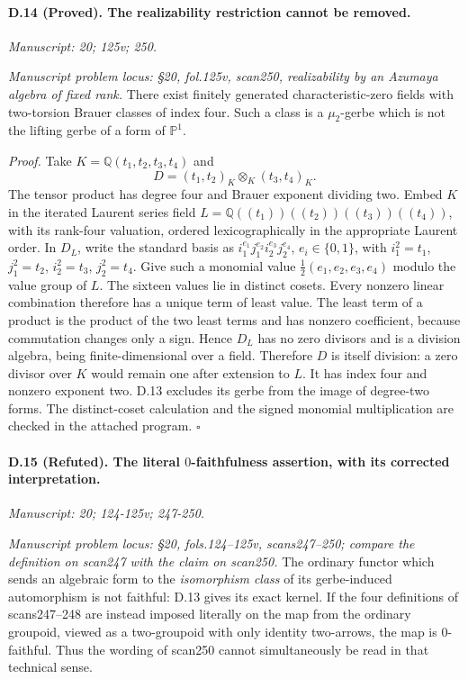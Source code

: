\paragraph{D.14 (Proved). The realizability restriction cannot be removed.}
\textit{Manuscript: 20; 125v; 250.}

\emph{Manuscript problem locus: \S20, fol.125v, scan250, realizability by an Azumaya algebra of fixed rank.}
There exist finitely generated characteristic-zero fields with two-torsion Brauer classes of index four. Such a class is a $\mu_2$-gerbe which is not the lifting gerbe of a form of $\mathbb P^1$.

\emph{Proof.} Take $K=\mathbb Q(t_1,t_2,t_3,t_4)$ and
\[
D=(t_1,t_2)_K\otimes_K(t_3,t_4)_K.
\]
The tensor product has degree four and Brauer exponent dividing two. Embed $K$ in the iterated Laurent series field $L=\mathbb Q((t_1))((t_2))((t_3))((t_4))$, with its rank-four valuation, ordered lexicographically in the appropriate Laurent order. In $D_L$, write the standard basis as $i_1^{e_1}j_1^{e_2}i_2^{e_3}j_2^{e_4}$, $e_i\in\{0,1\}$, with $i_1^2=t_1$, $j_1^2=t_2$, $i_2^2=t_3$, $j_2^2=t_4$. Give such a monomial value $\frac12(e_1,e_2,e_3,e_4)$ modulo the value group of $L$. The sixteen values lie in distinct cosets. Every nonzero linear combination therefore has a unique term of least value. The least term of a product is the product of the two least terms and has nonzero coefficient, because commutation changes only a sign. Hence $D_L$ has no zero divisors and is a division algebra, being finite-dimensional over a field. Therefore $D$ is itself division: a zero divisor over $K$ would remain one after extension to $L$. It has index four and nonzero exponent two. D.13 excludes its gerbe from the image of degree-two forms. The distinct-coset calculation and the signed monomial multiplication are checked in the attached program. \hfill$\square$

\paragraph{D.15 (Refuted). The literal $0$-faithfulness assertion, with its corrected interpretation.}
\textit{Manuscript: 20; 124-125v; 247-250.}

\emph{Manuscript problem locus: \S20, fols.124--125v, scans247--250; compare the definition on scan247 with the claim on scan250.}
The ordinary functor which sends an algebraic form to the \emph{isomorphism class} of its gerbe-induced automorphism is not faithful: D.13 gives its exact kernel. If the four definitions of scans247--248 are instead imposed literally on the map from the ordinary groupoid, viewed as a two-groupoid with only identity two-arrows, the map is $0$-faithful. Thus the wording of scan250 cannot simultaneously be read in that technical sense.


